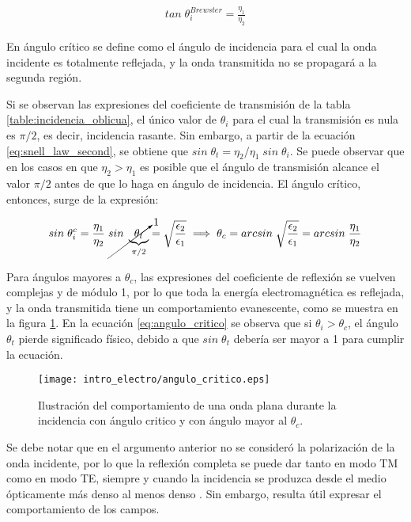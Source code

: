\begin{align}
	\label{eq:Brewster_angle}
	tan\;\theta_i^{Brewster} = \frac{\eta_1}{\eta_2}
\end{align}

En ángulo crítico se define como el ángulo de incidencia para el cual la onda incidente es totalmente reflejada, y la onda transmitida no se propagará a la segunda región.

Si se observan las expresiones del coeficiente de transmisión de la tabla \ref{table:incidencia_oblicua}, el único valor de $\theta_i$ para el cual la transmisión es nula es $\pi/2$, es decir, incidencia rasante. Sin embargo, a partir de la ecuación \ref{eq:snell_law_second}, se obtiene que $sin \; \theta_t = \eta_2 / \eta_1\; sin\; \theta_i$. Se puede observar que en los casos en que $\eta_2 > \eta_1$ es posible que el ángulo de transmisión alcance el valor $\pi/2$ antes de que lo haga en ángulo de incidencia. El ángulo crítico, entonces, surge de la expresión:

\begin{equation}
	\label{eq:angulo_critico}
	sin\; \theta_i^c = \frac{\eta_1}{\eta_2}\;\cancelto{1}{sin \; \underbrace{\theta_t}_{\pi/2}} = \sqrt{\frac{\epsilon_2}{\epsilon_1}} \implies \theta_c = arcsin \;\sqrt{\frac{\epsilon_2}{\epsilon_1}} = arcsin \;\frac{\eta_1}{\eta_2}
\end{equation}

Para ángulos mayores a $\theta_c$, las expresiones del coeficiente de reflexión se vuelven complejas y de módulo 1, por lo que toda la energía electromagnética es reflejada, y la onda transmitida tiene un comportamiento evanescente, como se muestra en la figura \ref{fig:angulo_critico}. En la ecuación \ref{eq:angulo_critico} se observa que si $\theta_i > \theta_c$, el ángulo $\theta_t$ pierde significado físico, debido a que $sin\; \theta_t$ debería ser mayor a 1 para cumplir la ecuación.

\begin{figure}[htp]
	\centering
	\texttt{[image: intro\_electro/angulo\_critico.eps]}
	\caption{Ilustración del comportamiento de una onda plana durante la incidencia con ángulo critico y con ángulo mayor al $\theta_c$.}
	\label{fig:angulo_critico}
\end{figure}

Se debe notar que en el argumento anterior no se consideró la polarización de la onda incidente, por lo que la reflexión completa se puede dar tanto en modo TM como en modo TE, siempre y cuando la incidencia se produzca desde el medio ópticamente más denso al menos denso \cite{Fernandez:Electromag}. Sin embargo, resulta útil expresar el comportamiento de los campos.

